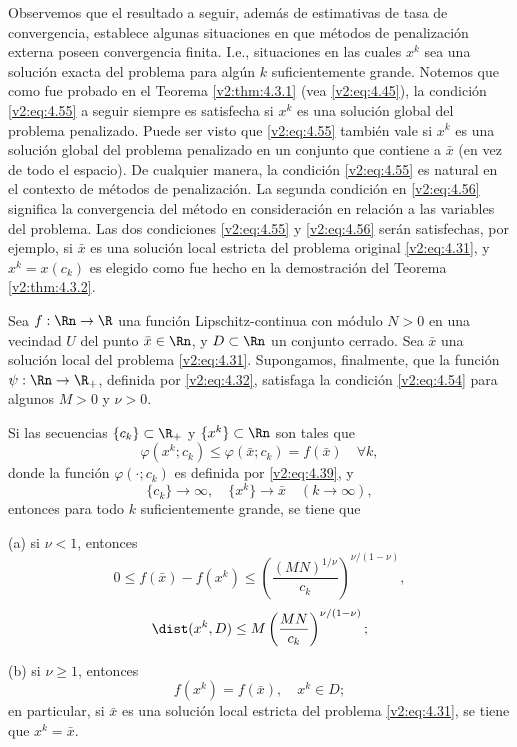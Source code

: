 Observemos que el resultado a seguir, además de estimativas de tasa de convergencia, establece algunas situaciones en que métodos de penalización externa poseen convergencia finita. I.e., situaciones en las cuales $x^k$ sea una solución exacta del problema para algún $k$ suficientemente grande. Notemos que como fue probado en el Teorema \ref{v2:thm:4.3.1} (vea \eqref{v2:eq:4.45}), la condición \eqref{v2:eq:4.55} a seguir siempre es satisfecha si $x^k$ es una solución global del problema penalizado. Puede ser visto que \eqref{v2:eq:4.55} también vale si $x^k$ es una solución global del problema penalizado en un conjunto que contiene a $\bar{x}$ (en vez de todo el espacio). De cualquier manera, la condición \eqref{v2:eq:4.55} es natural en el contexto de métodos de penalización. La segunda condición en \eqref{v2:eq:4.56} significa la convergencia del método en consideración en relación a las variables del problema. Las dos condiciones \eqref{v2:eq:4.55} y \eqref{v2:eq:4.56} serán satisfechas, por ejemplo, si $\bar{x}$ es una solución local estricta del problema original \eqref{v2:eq:4.31}, y $x^k = x(c_k)$ es elegido como fue hecho en la demostración del Teorema \ref{v2:thm:4.3.2}.

\begin{theorem}\label{v2:thm:4.3.3}
    Sea $f : \Rn \to \R$ una función Lipschitz-continua con módulo $N > 0$ en una vecindad $U$ del punto $\bar{x} \in \Rn$, y $D \subset \Rn$ un conjunto cerrado. Sea $\bar{x}$ una solución local del problema \eqref{v2:eq:4.31}. Supongamos, finalmente, que la función $\psi : \Rn \to \R_+$, definida por \eqref{v2:eq:4.32}, satisfaga la condición \eqref{v2:eq:4.54} para algunos $M > 0$ y $\nu > 0$.
    
    Si las secuencias $\{c_k\} \subset \R_+$ y $\{x^k\} \subset \Rn$ son tales que
    \begin{equation}
        \varphi(x^k; c_k) \le \varphi(\bar{x}; c_k) = f(\bar{x}) \quad \forall k,
        \label{v2:eq:4.55}
    \end{equation}
    donde la función $\varphi(\cdot; c_k)$ es definida por \eqref{v2:eq:4.39}, y
    \begin{equation}
        \{c_k\} \to \infty, \quad \{x^k\} \to \bar{x} \quad (k \to \infty),
        \label{v2:eq:4.56}
    \end{equation}
    entonces para todo $k$ suficientemente grande, se tiene que
    
    (a) si $\nu < 1$, entonces
    \begin{equation}
        0 \le f(\bar{x}) - f(x^k) \le \left( \frac{(MN)^{1/\nu}}{c_k} \right)^{\nu / (1 - \nu)},
        \label{v2:eq:4.57}
    \end{equation}
    \begin{equation}
        \dist(x^k, D) \le M\left( \frac{MN}{c_k} \right)^{\nu / (1 - \nu)};
        \label{v2:eq:4.58}
    \end{equation}
    
    (b) si $\nu \ge 1$, entonces
    \[
        f(x^k) = f(\bar{x}), \quad x^k \in D;
    \]
    en particular, si $\bar{x}$ es una solución local estricta del problema \eqref{v2:eq:4.31}, se tiene que $x^k = \bar{x}$.
\end{theorem}

